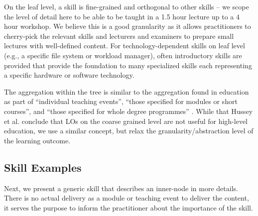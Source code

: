 \documentclass[jocse]{jocseart}
\begin{document}
On the leaf level, a skill is fine-grained and orthogonal to other skills -- we scope the level of detail here to be able to be taught in a 1.5 hour lecture up to a 4 hour workshop.
We believe this is a good granularity as it allows practitioners to cherry-pick the relevant skills and lecturers and examiners to prepare small lectures with well-defined content.
For technology-dependent skills on leaf level (e.g., a specific file system or workload manager), often introductory skills are provided that provide the foundation to many specialized skills each representing a specific hardware or software technology.

The aggregation within the tree is similar to the aggregation found in education as part of “individual teaching events”, “those specified for modules or short courses”, and “those specified for whole degree programmes” \cite{hussey2008learning}.
While that Hussey et al. conclude that LOs on the coarse grained level are not useful for high-level education, we use a similar concept, but relax the granularity/abstraction level of the learning outcome.

\subsection{Skill Examples}

Next, we present a generic skill that describes an inner-node in more details.
There is no actual delivery as a module or teaching event to deliver the content, it serves the purpose to inform the practitioner about the importance of the skill.
\end{document}
